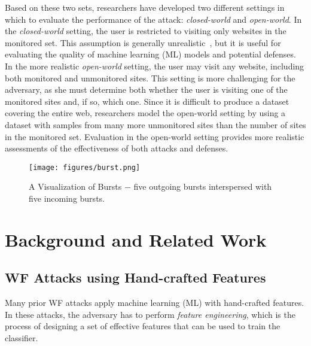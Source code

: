 \documentclass[USenglish,oneside,twocolumn]{article}
\begin{document}
Based on these two sets, researchers have developed two different settings in which to evaluate the performance of the attack:
\emph{closed-world} and \emph{open-world}. In the \emph{closed-world} setting, the user is restricted to visiting only websites in the monitored set. This assumption is generally unrealistic~\cite{Juarez2014, perry2013critique}, but it is useful for evaluating the quality of machine learning (ML) models and potential defenses. In the more realistic \emph{open-world} setting, the user may visit any website, including both monitored and unmonitored sites. This setting is more challenging for the adversary, as she must determine both whether the user is visiting one of the monitored sites and, if so, which one. Since it is difficult to produce a dataset covering the entire web, researchers model the open-world setting by using a dataset with samples from many more unmonitored sites than the number of sites in the monitored set. Evaluation in the open-world setting provides more realistic assessments of the effectiveness of both attacks and defenses.










\begin{figure}[ht!]
	\centering
    \texttt{[image: figures/burst.png]}
    \caption{A Visualization of Bursts $-$ five outgoing bursts interspersed with five incoming bursts.}
    \label{burst}
\end{figure}

\fi
 
\section{Background and Related Work}





\subsection{WF Attacks using Hand-crafted Features}
\label{wfattack_hancrafted}

Many prior WF attacks apply machine learning (ML) with hand-crafted features. In these attacks, the adversary has to perform \emph{feature engineering}, which is the process of designing a set of effective features that can be used to train the classifier. 
\end{document}
